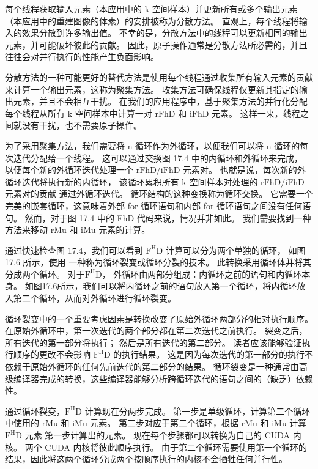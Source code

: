 每个线程获取输入元素（本应用中的 k 空间样本）并更新所有或多个输出元素（本应用中的重建图像的体素）的安排被称为分散方法。 
直观上，每个线程将输入的效果分散到许多输出值。 不幸的是，分散方法中的线程可以更新相同的输出元素，并可能破坏彼此的贡献。 
因此，原子操作通常是分散方法所必需的，并且往往会对并行执行的性能产生负面影响。

分散方法的一种可能更好的替代方法是使用每个线程通过收集所有输入元素的贡献来计算一个输出元素，这称为聚集方法。 
收集方法可确保线程仅更新其指定的输出元素，并且不会相互干扰。 
在我们的应用程序中，基于聚集方法的并行化分配每个线程从所有 $\mathrm{k}$ 空间样本中计算一对 $\mathrm{rFhD}$ 
和 $\mathrm{iFhD}$ 元素。 这样一来，线程之间就没有干扰，也不需要原子操作。

为了采用聚集方法，我们需要将 n 循环作为外循环，以便我们可以将 n 循环的每次迭代分配给一个线程。 
这可以通过交换图 17.4 中的内循环和外循环来完成，
以便每个新的外循环迭代处理一个 $\mathrm{rFhD} / \mathrm{iFhD}$ 元素对。 
也就是说，每次新的外循环迭代将执行新的内循环，
该循环累积所有 $\mathrm{k}$ 空间样本对处理的 $\mathrm{rFhD} / \mathrm{iFhD}$ 元素对的贡献 通过外循环迭代。 
循环结构的这种变换称为循环交换。 
它需要一个完美的嵌套循环，这意味着外部 for 循环语句和内部 for 循环语句之间没有任何语句。 
然而，对于图 17.4 中的 FhD 代码来说，情况并非如此。 我们需要找到一种方法来移动 rMu 和 iMu 元素的计算。

通过快速检查图 17.4，我们可以看到 $\mathrm{F}^{\mathrm{H}} \mathrm{D}$ 计算可以分为两个单独的循环，
如图 17.6 所示，使用 一种称为循环裂变或循环分裂的技术。 
此转换采用循环体并将其分成两个循环。 对于$\mathrm{F}^{\mathrm{H}} \mathrm{D}$，
外循环由两部分组成：内循环之前的语句和内循环本身。 
如图17.6所示，我们可以将内循环之前的语句放入第一个循环，将内循环放入第二个循环，从而对外循环进行循环裂变。

循环裂变中的一个重要考虑因素是转换改变了原始外循环两部分的相对执行顺序。 
在原始外循环中，第一次迭代的两个部分都在第二次迭代之前执行。 
裂变之后，所有迭代的第一部分将执行； 然后是所有迭代的第二部分。 
读者应该能够验证执行顺序的更改不会影响 $\mathrm{F}^{\mathrm{H}} \mathrm{D}$ 的执行结果。 
这是因为每次迭代的第一部分的执行不依赖于原始外循环的任何先前迭代的第二部分的结果。 
循环裂变是一种通常由高级编译器完成的转换，这些编译器能够分析跨循环迭代的语句之间的（缺乏）依赖性。

通过循环裂变，$\mathrm{F}^{\mathrm{H}} \mathrm{D}$ 计算现在分两步完成。 
第一步是单级循环，计算第二个循环中使用的 $\mathrm{rMu}$ 和 $\mathrm{iMu}$ 元素。 
第二步对应于第二个循环，根据 $\mathrm{rMu}$ 和 $\mathrm{iMu}$ 
计算 $\mathrm{F}^{\mathrm{H}} \mathrm{D}$ 元素 第一步计算出的元素。 现在每个步骤都可以转换为自己的 CUDA 内核。 
两个 CUDA 内核将彼此顺序执行。 
由于第二个循环需要使用第一个循环的结果，因此将这两个循环分成两个按顺序执行的内核不会牺牲任何并行性。

